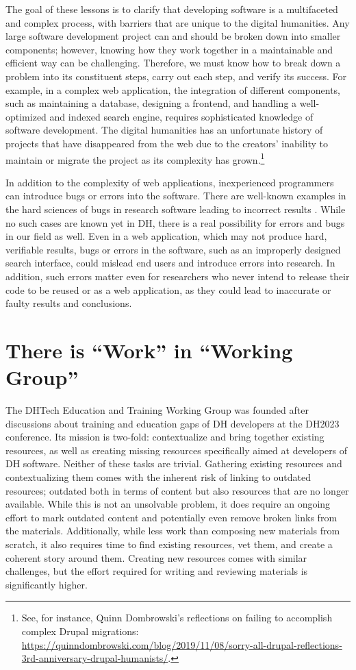 \documentclass[final]{anthology-ch} %
\begin{document}
The goal of these lessons is to clarify that developing software is a multifaceted and complex process, with barriers that are unique to the digital humanities.  Any large software development project can and should be broken down into smaller components; however, knowing how they work together in a maintainable and efficient way can be challenging. Therefore, we must know how to break down a problem into its constituent steps, carry out each step, and verify its success. For example, in a complex web application, the integration of different components, such as maintaining a database, designing a frontend, and handling a well-optimized and indexed search engine, requires sophisticated knowledge of software development. The digital humanities has an unfortunate history of projects that have disappeared from the web due to the creators’ inability to maintain or migrate the project as its complexity has grown.\footnote{See, for instance, Quinn Dombrowski’s reflections on failing to accomplish complex Drupal migrations: \url{https://quinndombrowski.com/blog/2019/11/08/sorry-all-drupal-reflections-3rd-anniversary-drupal-humanists/}.
}

In addition to the complexity of web applications, inexperienced programmers can introduce bugs or errors into the software. There are well-known examples in the hard sciences of bugs in research software leading to incorrect results \cite{neupane2019}. While no such cases are known yet in DH, there is a real possibility for errors and bugs in our field as well. Even in a web application, which may not produce hard, verifiable results, bugs or errors in the software, such as an improperly designed search interface, could mislead end users and introduce errors into research. In addition, such errors matter even for researchers who never intend to release their code to be reused or as a web application, as they could lead to inaccurate or faulty results and conclusions.


\section{There is “Work” in “Working Group”}

The DHTech Education and Training Working Group was founded after discussions about training and education gaps of DH developers at the DH2023 conference. Its mission is two-fold: contextualize and bring together existing resources, as well as creating missing resources specifically aimed at developers of DH software. Neither of these tasks are trivial. Gathering existing resources and contextualizing them comes with the inherent risk of linking to outdated resources; outdated both in terms of content but also resources that are no longer available. While this is not an unsolvable problem, it does require an ongoing effort to mark outdated content and potentially even remove broken links from the materials. Additionally, while less work than composing new materials from scratch, it also requires time to find existing resources, vet them, and create a coherent story around them. Creating new resources comes with similar challenges, but the effort required for writing and reviewing materials is significantly higher.
\end{document}
